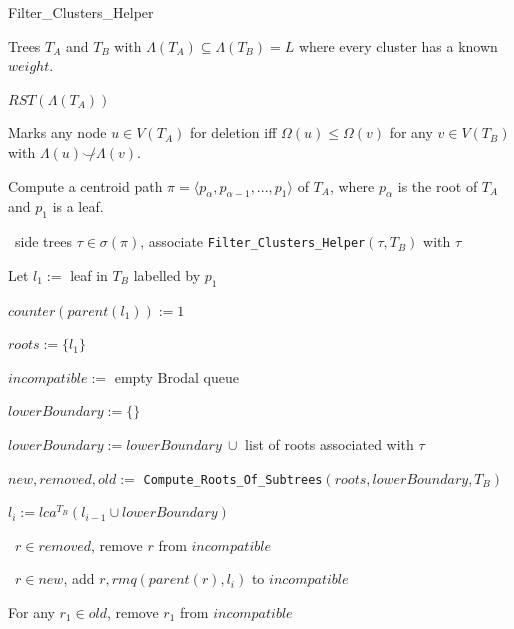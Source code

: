 \documentclass{article}
\newcommand{\compatible}{\smile}
\newcommand{\leafset}{\Lambda}
\begin{document}
    \begin{algorithm}[ht]
        \caption{Filter\_Clusters\_Helper}
        \label{alg:filterclustershelper}

        \begin{algorithmic}[1]
            \Input Trees $T_A$ and $T_B$ with $\leafset(T_A) \subseteq \leafset(T_B) = L$ where every cluster has a known $weight$.

            \Output $RST(\leafset(T_A))$

            \SideEffect Marks any node $u \in V(T_A)$ for deletion iff $\Omega(u) \leq \Omega(v)$ for any $v \in V(T_B)$ with $\leafset(u) \not\compatible \leafset(v)$.

            \State Compute a centroid path $\pi = \langle p_{\alpha}, p_{\alpha - 1}, ..., p_1 \rangle$ of $T_A$, where $p_{\alpha}$ is the root of $T_A$ and $p_1$ is a leaf.

            \State \algorithmicforall\ side trees $\tau \in \sigma(\pi)$,
                associate \texttt{Filter\_Clusters\_Helper}$(\tau, T_B)$ with $\tau$

            \State Let $l_1 :=$ leaf in $T_B$ labelled by $p_1$

            \State $counter(parent(l_1)) := 1$

            \State $roots := \{l_1\}$

            \State $incompatible :=$ empty Brodal queue

                \State $lowerBoundary := \{\}$

                    \State $lowerBoundary := lowerBoundary\ \cup$ list of roots associated with $\tau$
                \EndFor

                \State $new, removed, old :=$ \texttt{Compute\_Roots\_Of\_Subtrees}$(roots, lowerBoundary, T_B)$

                \State $l_i := lca^{T_B}(l_{i-1} \cup lowerBoundary)$

                \State \algorithmicforall\ $r \in removed$, remove $r$ from $incompatible$
                \label{step:removedrootsremoval}

                \State \algorithmicforall\ $r \in new$, add $r, rmq(parent(r), l_i)$ to $incompatible$

                    \State For any $r_1 \in old$, remove $r_1$ from $incompatible$
                    \label{step:oldrootremoval}


\end{algorithmic}
\end{algorithm}
\end{document}
